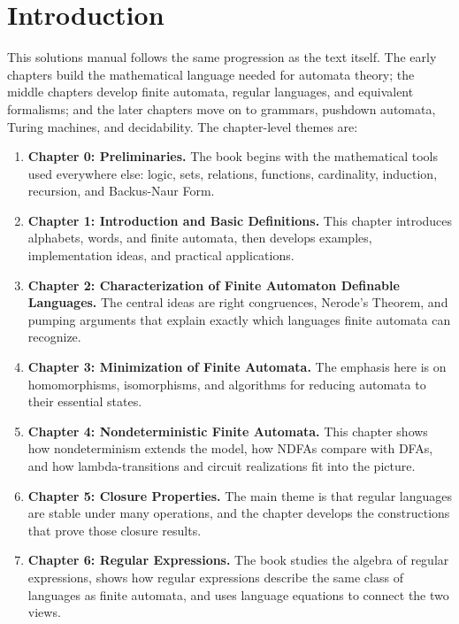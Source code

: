 \chapter*{Introduction}

This solutions manual follows the same progression as the text itself. The early
chapters build the mathematical language needed for automata theory; the middle
chapters develop finite automata, regular languages, and equivalent formalisms;
and the later chapters move on to grammars, pushdown automata, Turing machines,
and decidability. The chapter-level themes are:

\begin{enumerate}
\item \textbf{Chapter 0: Preliminaries.} The book begins with the mathematical
tools used everywhere else: logic, sets, relations, functions, cardinality,
induction, recursion, and Backus-Naur Form.

\item \textbf{Chapter 1: Introduction and Basic Definitions.} This chapter
introduces alphabets, words, and finite automata, then develops examples,
implementation ideas, and practical applications.

\item \textbf{Chapter 2: Characterization of Finite Automaton Definable
Languages.} The central ideas are right congruences, Nerode's Theorem, and
pumping arguments that explain exactly which languages finite automata can
recognize.

\item \textbf{Chapter 3: Minimization of Finite Automata.} The emphasis here is
on homomorphisms, isomorphisms, and algorithms for reducing automata to their
essential states.

\item \textbf{Chapter 4: Nondeterministic Finite Automata.} This chapter shows
how nondeterminism extends the model, how NDFAs compare with DFAs, and how
lambda-transitions and circuit realizations fit into the picture.

\item \textbf{Chapter 5: Closure Properties.} The main theme is that regular
languages are stable under many operations, and the chapter develops the
constructions that prove those closure results.

\item \textbf{Chapter 6: Regular Expressions.} The book studies the algebra of
regular expressions, shows how regular expressions describe the same class of
languages as finite automata, and uses language equations to connect the two
views.


\end{enumerate}
